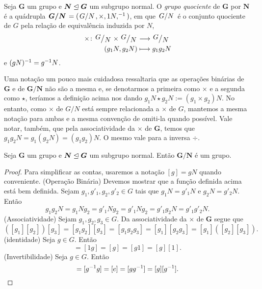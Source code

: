 \begin{definition}
Seja $\bm G$ um grupo e $\bm N \mathrel{\unlhd} \bm G$ um subgrupo normal. O \emph{grupo quociente} de $\bm G$ por $\bm N$ é a quádrupla $\bm{\quo{G}{N}}=(\quo{G}{N},\times,1 N,\inv)$, em que $\quo{G}{N}$ é o conjunto quociente de $G$ pela relação de equivalência induzida por $N$,
	\begin{align*}
	\func{\times}{\quo{G}{N} \times \quo{G}{N}}{\quo{G}{N}}{(g_1N,g_2N)}{g_1g_2N}
	\end{align*}
e $(gN)^{-1}=g^{-1} N$.
\end{definition}

Uma notação um pouco mais cuidadosa ressaltaria que as operações binárias de $\bm G$ e de $\bm{G/N}$ não são a mesma e, se denotarmos a primeira como $\times$ e a segunda como $\star$, teríamos a definição acima nos dando $g_1N \star g_2N := (g_1 \times g_2)N$. No entanto, como $\times$ de $G/N$ está sempre relacionada a $\times$ de $G$, mantemos a mesma notação para ambas e a mesma convenção de omiti-la quando possível. Vale notar, também, que pela associatividade da $\times$ de $\bm G$, temos que $g_1g_2N=g_1(g_2N)=(g_1g_2)N$. O mesmo vale para a inversa $\div$.

\begin{proposition}
Seja $\bm G$ um grupo e $\bm N \mathrel{\unlhd} \bm G$ um subgrupo normal. Então $\bm{G/N}$ é um grupo.
\end{proposition}
\begin{proof}
Para simplificar as contas, usaremos a notação $[g]=gN$ quando conveniente.
(Operação Binária) Devemos mostrar que a função definida acima está bem definida. Sejam $g_1,g'_1,g_2,g'_2 \in G$ tais que $g_1N=g'_1N$ e $g_2N=g'_2N$. Então
	\begin{equation*}
	g_1g_2N = g_1Ng_2 = g'_1Ng_2 = g'_1Ng_2 = g'_1g_2N=g'_1g'_2N.
	\end{equation*}
(Associatividade) Sejam $g_1,g_2,g_3 \in G$. Da associatividade da $\times$ de $\bm G$ segue que
	\begin{equation*}
	([g_1][g_2])[g_3] = [g_1g_2][g_3] = [g_1g_2g_3] = [g_1][g_2g_3] = [g_1]([g_2] [g_3]).
	\end{equation*}
(identidade) Seja $g \in G$. Então
	\begin{equation*}
	[1][g] = [1 g] = [g] = [g 1] = [g][1].
	\end{equation*}
(Invertibilidade) Seja $g \in G$. Então
	\begin{equation*}
	[g\inv][g] = [g\inv g] = [e] = [gg\inv] = [g][g\inv].
	\end{equation*}
\end{proof}

